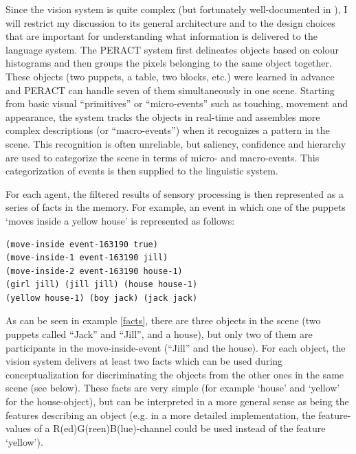 Since the vision system is quite complex (but fortunately well-documented in \citealp{baillie00action}), I will restrict my discussion to its general architecture and to the design choices that are important for understanding what information is delivered to the language system. The PERACT system first delineates objects based on colour histograms and then groups the pixels belonging to the same object together. These objects (two puppets, a table, two blocks, etc.) were learned in advance and PERACT can handle seven of them simultaneously in one scene. Starting from basic visual ``primitives'' or ``micro-events'' such as touching, movement and appearance, the system tracks the objects in real-time and assembles more complex descriptions (or ``macro-events'') when it recognizes a pattern in the scene. This recognition is often unreliable, but saliency, confidence and hierarchy are used to categorize the scene in terms of micro- and macro-events. This categorization of events is then supplied to the linguistic system.

For each agent, the filtered results of sensory processing is then represented as a series of facts in the memory. For example, an event in which one of the puppets `moves inside a yellow house' is represented as follows:

\ea
\label{facts}
\begin{lstlisting}
(move-inside event-163190 true)
(move-inside-1 event-163190 jill)
(move-inside-2 event-163190 house-1)
(girl jill) (jill jill) (house house-1) 
(yellow house-1) (boy jack) (jack jack)
\end{lstlisting}
\z

As can be seen in example \ref{facts}, there are three objects in the scene (two puppets called ``Jack'' and ``Jill'', and a house), but only two of them are participants in the move-inside-event (``Jill'' and the house). For each object, the vision system delivers at least two facts which can be used during conceptualization for discriminating the objects from the other ones in the same scene (see below). These facts are very simple (for example `house' and `yellow' for the house-object), but can be interpreted in a more general sense as being the features describing an object (e.g. in a more detailed implementation, the feature-values of a R(ed)G(reen)B(lue)-channel could be used instead of the feature `yellow').

